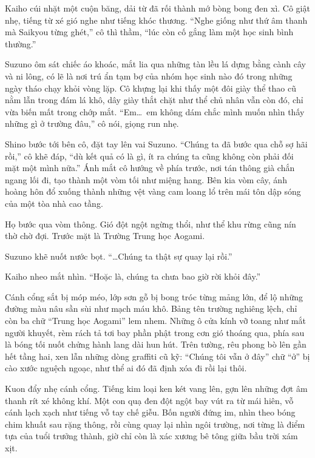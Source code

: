 \documentclass[../main.tex]{subfiles}
\begin{document}
Kaiho cúi nhặt một cuộn băng, dải từ đã rối thành mớ bòng bong đen xì. Cô giật nhẹ, tiếng từ xé gió nghe như tiếng khóc thương. ``Nghe giống như thứ âm thanh mà Saikyou từng ghét,'' cô thì thầm, ``lúc còn cố gắng làm một học sinh bình thường.''

Suzuno ôm sát chiếc áo khoác, mắt lia qua những tàn lều lá dựng bằng cành cây và ni lông, có lẽ là nơi trú ẩn tạm bợ của nhóm học sinh nào đó trong những ngày tháo chạy khỏi vòng lặp. Cô khựng lại khi thấy một đôi giày thể thao cũ nằm lẫn trong đám lá khô, dây giày thắt chặt như thể chủ nhân vẫn còn đó, chỉ vừa biến mất trong chớp mắt. ``Em\dots\ em không dám chắc mình muốn nhìn thấy những gì ở trường đâu,'' cô nói, giọng run nhẹ.

Shino bước tới bên cô, đặt tay lên vai Suzuno. ``Chúng ta đã bước qua chỗ sợ hãi rồi,'' cô khẽ đáp, ``dù kết quả có là gì, ít ra chúng ta cũng không còn phải đối mặt một mình nữa.'' Ánh mắt cô hướng về phía trước, nơi tán thông già chắn ngang lối đi, tạo thành một vòm tối như miệng hang. Bên kia vòm cây, ánh hoàng hôn đổ xuống thành những vệt vàng cam loang lổ trên mái tôn dập sóng của một tòa nhà cao tầng.

\ct

Họ bước qua vòm thông. Gió đột ngột ngừng thổi, như thể khu rừng cũng nín thờ chờ đợi. Trước mặt là Trường Trung học Aogami.

Suzuno khẽ nuốt nước bọt. ``\dots Chúng ta thật sự quay lại rồi.''

Kaiho nheo mắt nhìn. ``Hoặc là, chúng ta chưa bao giờ rời khỏi đây.''


Cánh cổng sắt bị móp méo, lớp sơn gỗ bị bong tróc từng mảng lớn, để lộ những đường màu nâu sần sùi như mạch máu khô. Bảng tên trường nghiêng lệch, chỉ còn ba chữ ``Trung học Aogami'' lem nhem. Những ô cửa kính vỡ toang như mắt người khuyết, rèm rách tả tơi bay phần phật trong cơn gió thoáng qua, phía sau là bóng tối nuốt chửng hành lang dài hun hút. Trên tường, rêu phong bò lên gần hết tầng hai, xen lẫn những dòng graffiti cũ kỹ: ``Chúng tôi vẫn ở đây'' chữ ``ở'' bị cào xước nguệch ngoạc, như thể ai đó đã định xóa đi rồi lại thôi.

Kuon đẩy nhẹ cánh cổng. Tiếng kim loại ken két vang lên, gợn lên những đợt âm thanh rít xé không khí. Một con quạ đen đột ngột bay vút ra từ mái hiên, vỗ cánh lạch xạch như tiếng vỗ tay chế giễu. Bốn người đứng im, nhìn theo bóng chim khuất sau rặng thông, rồi cùng quay lại nhìn ngôi trường, nơi từng là điểm tựa của tuổi trưởng thành, giờ chỉ còn là xác xương bê tông giữa bầu trời xám xịt.
\end{document}
